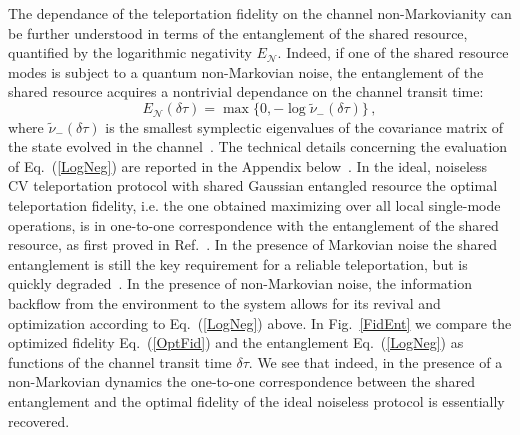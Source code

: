 \documentclass[prl,twocolumn,aps,floatfix,showpacs,tightenlines,superscriptaddress,amsmath,amssymb,amsfonts,10pt]{revtex4-1}
\begin{document}
The dependance of the teleportation fidelity on the channel non-Markovianity can be further understood in terms of the entanglement of the shared resource, quantified by the logarithmic negativity $E_{\mathcal{N}}$. Indeed, if one of the shared resource modes is subject to a quantum non-Markovian noise, the entanglement of the shared resource acquires a nontrivial dependance on the channel transit time:
\begin{equation}\label{LogNeg}
E_{\mathcal{N}}(\delta\tau)=\max\{0,-\log\tilde{\nu}_-(\delta\tau)\} \, ,
\end{equation}
where $\tilde{\nu}_-(\delta\tau)$ is the smallest symplectic eigenvalues of the covariance matrix of the state evolved in the channel~\cite{1751-8121-40-28-S01}. The technical details concerning the evaluation of Eq.~(\ref{LogNeg}) are reported in the Appendix below~\cite{SuppMat}. In the ideal, noiseless CV teleportation protocol with shared Gaussian entangled resource the optimal teleportation fidelity, i.e. the one obtained maximizing over all local single-mode operations, is in one-to-one correspondence with the entanglement of the shared resource, as first proved in Ref.~\cite{PhysRevLett.95.150503}. In the presence of Markovian noise the shared entanglement is still the key requirement for a reliable teleportation, but is quickly degraded~\cite{PhysRevA.81.012333}. In the presence of non-Markovian noise, the information backflow from the environment to the system allows for its revival and optimization according to Eq.~(\ref{LogNeg}) above. In Fig.~\ref{FidEnt} we compare the optimized fidelity Eq.~(\ref{OptFid}) and the entanglement Eq.~(\ref{LogNeg}) as functions of the channel transit time $\delta\tau$. We see that indeed, in the presence of a non-Markovian dynamics the one-to-one correspondence between the shared entanglement and the optimal fidelity of the ideal noiseless protocol is essentially recovered.
\end{document}
